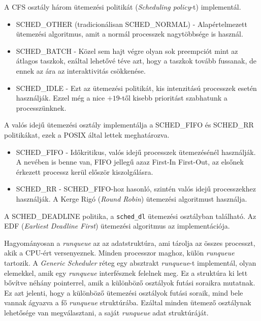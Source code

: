 

A CFS osztály három ütemezési politikát (\textit{Scheduling policy}-t) implementál.
\begin{itemize}
	\item SCHED\_OTHER (tradicionálisan  SCHED\_NORMAL) - Alapértelmezett ütemezési algoritmus, amit a normál processzek nagytöbbsége is használ.

    \item SCHED\_BATCH - Közel sem hajt végre olyan sok preempciót mint az átlagos taszkok, ezáltal lehetővé téve azt, hogy a taszkok tovább fussanak, de ennek az ára az interaktivitás csökkenése.
        
	\item SCHED\_IDLE - Ezt az ütemezési politikát, kis intenzitású processzek esetén használják. Ezzel még a nice $+19$-től kisebb prioritást szabhatunk a processzünknek.
\end{itemize}
A valós idejű ütemezési osztály implementálja a SCHED\_FIFO és SCHED\_RR politikákat, ezek a POSIX által lettek meghatározva.
\begin{itemize}
	\item SCHED\_FIFO - Időkritikus, valós idejű processzek ütemezésénél használják. A nevében is benne van, FIFO jellegű azaz First-In First-Out, az elsőnek érkezett processz kerül először kiszolgálásra. 
	\item SCHED\_RR - SCHED\_FIFO-hoz hasonló, szintén valós idejű processzekhez használják. A Kerge Rigó (\textit{Round Robin}) ütemezési algoritmust használja.
\end{itemize}

A SCHED\_DEADLINE politika, a \texttt{sched\_dl} ütemezési osztályban található. Az EDF (\textit{Earliest Deadline First}) ütemezési algoritmus az implementációja.


Hagyományosan a \textit{runqueue} az az adatstruktúra, ami tárolja az összes processzt, akik a CPU-ért versenyeznek.
Minden processzor maghoz, külön \textit{runqueue} tartozik. 
A \textit{Generic Scheduler} réteg egy absztrakt \textit{runqueue}-t implementál, olyan elemekkel, amik egy \textit{runqueue} interfésznek felelnek meg.
Ez a struktúra ki lett bővítve néhány pointerrel, amik a különböző osztályok futási soraikra mutatnak. Ez azt jelenti, hogy a különböző ütemezési osztályok futási soraik, mind bele vannak ágyazva a fő \textit{runqueue} struktúrába. Ezáltal minden ütemező osztálynak lehetősége van megválasztani, a saját \textit{runqueue} adat struktúráját.

